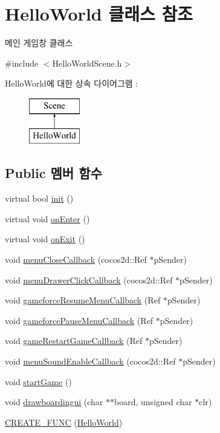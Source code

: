 \hypertarget{class_hello_world}{}\section{Hello\+World 클래스 참조}
\label{class_hello_world}


메인 게임창 클래스  




{\ttfamily \#include $<$Hello\+World\+Scene.\+h$>$}

Hello\+World에 대한 상속 다이어그램 \+: \begin{figure}[H]
\begin{center}
\leavevmode
\includegraphics[height=2.000000cm]{class_hello_world}
\end{center}
\end{figure}
\subsection*{Public 멤버 함수}
\begin{DoxyCompactItemize}
\item 
virtual bool \hyperlink{class_hello_world_a65e2b1525051f3690e5a39ca56608a97}{init} ()
\item 
virtual void \hyperlink{class_hello_world_a0e47c5b1692f5ba74b776be85422dc75}{on\+Enter} ()
\item 
virtual void \hyperlink{class_hello_world_a348da8e1c3061248666676878e692572}{on\+Exit} ()
\item 
void \hyperlink{class_hello_world_ac4ab2f5e922e659d4f137591c0f6a9b0}{menu\+Close\+Callback} (cocos2d\+::\+Ref $\ast$p\+Sender)
\item 
void \hyperlink{class_hello_world_a1609fd202ff4b899571aeb34b3cdaed4}{menu\+Drawer\+Click\+Callback} (cocos2d\+::\+Ref $\ast$p\+Sender)
\item 
void \hyperlink{class_hello_world_a9765d6e42b96bcf6c025ae1905bd7a90}{gameforce\+Resume\+Menu\+Callback} (Ref $\ast$p\+Sender)
\item 
void \hyperlink{class_hello_world_ac202dde4f557f0b9b6c3d150da4eec65}{gameforce\+Pause\+Menu\+Callback} (Ref $\ast$p\+Sender)
\item 
void \hyperlink{class_hello_world_a73ad0d041144a1e610534fe5df41d556}{game\+Restart\+Game\+Callback} (Ref $\ast$p\+Sender)
\item 
void \hyperlink{class_hello_world_aa0aab5c2537449752853c2924db53261}{menu\+Sound\+Enable\+Callback} (cocos2d\+::\+Ref $\ast$p\+Sender)
\item 
void \hyperlink{class_hello_world_aa4c36099096e160e3726819a2308dd04}{start\+Game} ()
\item 
void \hyperlink{class_hello_world_a0456ce3ab8880643c5e8739634156d93}{drawboardingui} (char $\ast$$\ast$board, unsigned char $\ast$clr)
\item 
\hyperlink{class_hello_world_a857ebfbc49f3a7f81772bee4991d186b}{C\+R\+E\+A\+T\+E\+\_\+\+F\+U\+NC} (\hyperlink{class_hello_world}{Hello\+World})
\end{DoxyCompactItemize}

